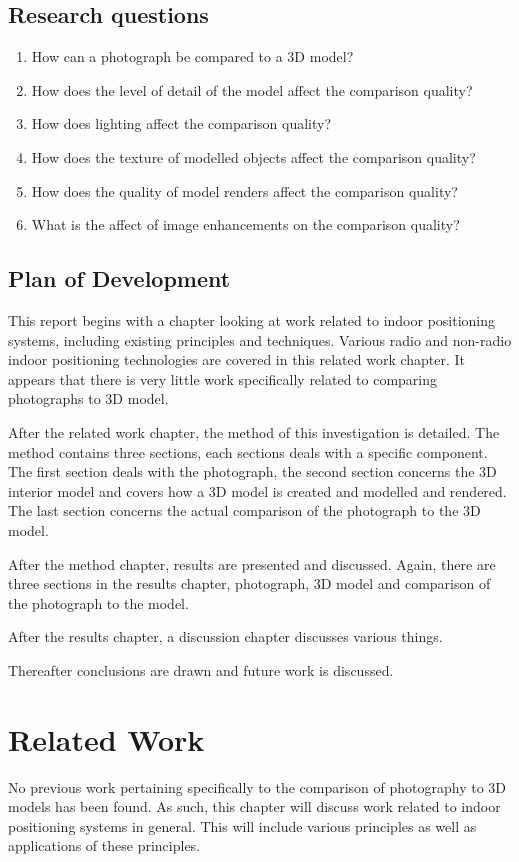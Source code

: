 \documentclass[11pt,a4paper]{report}
\begin{document}
	\section{Research questions}
		\begin{enumerate}
			\item How can a photograph be compared to a 3D model?
			\item How does the level of detail of the model affect the comparison quality?
			\item How does lighting affect the comparison quality?
			\item How does the texture of modelled objects affect the comparison quality?
			\item How does the quality of model renders affect the comparison quality?
			\item What is the affect of image enhancements on the comparison quality?
		\end{enumerate}
	
	\section{Plan of Development}
		This report begins with a chapter looking at work related to indoor positioning systems, including existing principles and techniques. Various radio and non-radio indoor positioning technologies are covered in this related work chapter. It appears that there is very little work specifically related to comparing photographs to 3D model.
		
		After the related work chapter, the method of this investigation is detailed. The method contains three sections, each sections deals with a specific component. The first section deals with the photograph, the second section concerns the 3D interior model and covers how a 3D model is created and modelled and rendered. The last section concerns the actual comparison of the photograph to the 3D model.
		
		After the method chapter, results are presented and discussed. Again, there are three sections in the results chapter, photograph, 3D model and comparison of the photograph to the model.
		
		After the results chapter, a discussion chapter discusses various things.
		
		Thereafter conclusions are drawn and future work is discussed.

\newpage
\chapter{Related Work}
	No previous work pertaining specifically to the comparison of photography to 3D models has been found. As such, this chapter will discuss work related to indoor positioning systems in general. This will include various principles as well as applications of these principles. 
	
\end{document}
